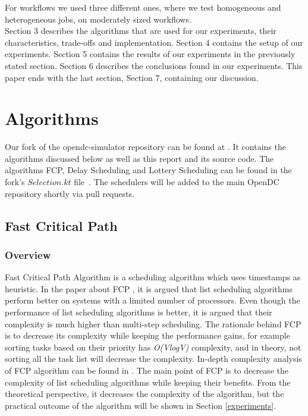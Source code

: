 \documentclass{article}
\begin{document}
For workflows we used three different ones, where we test homogeneous and heterogeneous jobs, on moderately sized workflows. 
\\
Section 3 describes the algorithms that are used for our experiments, their characteristics, trade-offs and implementation. Section 4 contains the setup of our experiments. Section 5 contains the results of our experiments in the previously stated section. Section 6 describes the conclusions found in our experiments. This paper ends with the last section, Section 7, containing our discussion.    


\section{Algorithms}
Our fork of the opendc-simulator repository can be found at \cite{OpenDC-fork}. It contains the algorithms discussed below as well as this report and its source code. The algorithms FCP, Delay Scheduling and Lottery Scheduling can be found in the fork's $Selection.kt$ file~\cite{algo-file}. The schedulers will be added to the main OpenDC repository shortly via pull requests.

\subsection{Fast Critical Path}
\subsubsection{Overview}
Fast Critical Path Algorithm is a scheduling algorithm which uses timestamps as heuristic. In the paper about FCP \cite{Radulescu99onthe}, it is argued that list scheduling algorithms perform better on systems with a limited number of processors. Even though the performance of list scheduling algorithms is better, it is argued that their complexity is much higher than multi-step scheduling. The rationale behind FCP is to decrease its complexity while keeping the performance gains, for example sorting tasks based on their priority has \textit{O(VlogV)} complexity, and in theory, not sorting all the task list will decrease the complexity. In-depth complexity analysis of FCP algorithm can be found in \cite{Radulescu99onthe}. The main point of FCP is to decrease the complexity of list scheduling algorithms while keeping their benefits. From the theoretical perspective, it decreases the complexity of the algorithm, but the practical outcome of the algorithm will be shown in Section \ref{experiments}.
\end{document}
